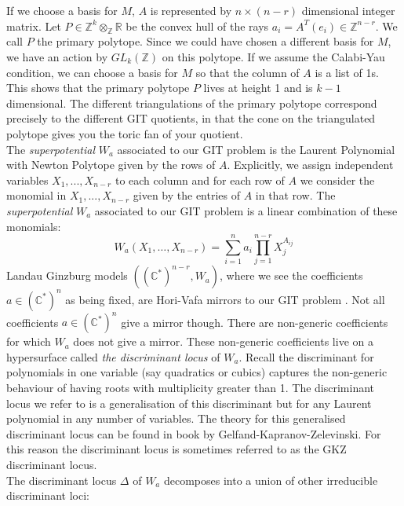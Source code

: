 \documentclass[oneside]{amsart}
\theoremstyle{definition}
\theoremstyle{definition}
\theoremstyle{definition}
\theoremstyle{definition}
\newcommand{\CC}{\mathbb{C}}
\newcommand{\Z}{\mathbb{Z}}
\newcommand{\R}{\mathbb{R}}
\begin{document}
If we choose a basis for $M$, $A$ is represented by $n\times (n-r)$ dimensional integer matrix. Let $P \in \Z^k \otimes_{\Z} \R$ be the convex hull of the rays $a_i = A^T(e_i) \in \Z^{n-r}$. We call $P$ the primary polytope. Since we could have chosen a different basis for $M$, we have an action by $GL_k(\Z)$ on this polytope. If we assume the Calabi-Yau condition, we can choose a basis for $M$ so that the column of $A$ is a list of 1s. This shows that the primary polytope $P$ lives at height 1 and  is $k-1$ dimensional.  The different triangulations of the primary polytope correspond precisely to the different GIT quotients, in that the cone on the triangulated polytope gives you the toric fan of your quotient. \\
\newline
The \textit{superpotential} $W_{a}$ associated to our GIT problem is the Laurent Polynomial with Newton Polytope given by the rows of $A$. Explicitly, we assign independent variables $X_1,...,X_{n-r}$ to each column and for each row of $A$ we consider the monomial in $X_1,...,X_{n-r}$ given by the entries of $A$ in that row. The \textit{superpotential} $W_{a}$ associated to our GIT problem is a linear combination of these monomials:
\begin{equation}
    \label{superpotential}
    W_a(X_1,\dots,X_{n-r}) = \sum_{i=1}^n a_i\prod_{j=1}^{n-r}X_j^{A_{ij}}
\end{equation}
Landau Ginzburg models $((\CC^*)^{n-r},W_a)$, where we see the coefficients $a \in (\CC^*)^{n}$ as being fixed, are Hori-Vafa mirrors to our GIT problem \cite{horivafa}. Not all coefficients $a \in (\CC^*)^{n}$ give a mirror though. There are non-generic coefficients for which $W_a$ does not give a mirror. These non-generic coefficients live on a hypersurface called \textit{the discriminant locus} of $W_a$. Recall the discriminant for polynomials in one variable (say quadratics or cubics) captures the non-generic behaviour of having roots with multiplicity greater than 1. The discriminant locus we refer to is a generalisation of this discriminant but for any Laurent polynomial in any number of variables. The theory for this generalised discriminant locus can be found in book \cite{gelfand1994discriminants} by Gelfand-Kapranov-Zelevinski. For this reason the discriminant locus is sometimes referred to as the GKZ discriminant locus. \\
\newline
The discriminant locus $\Delta$ of $W_a$ decomposes into a union of other irreducible discriminant loci:
\end{document}
